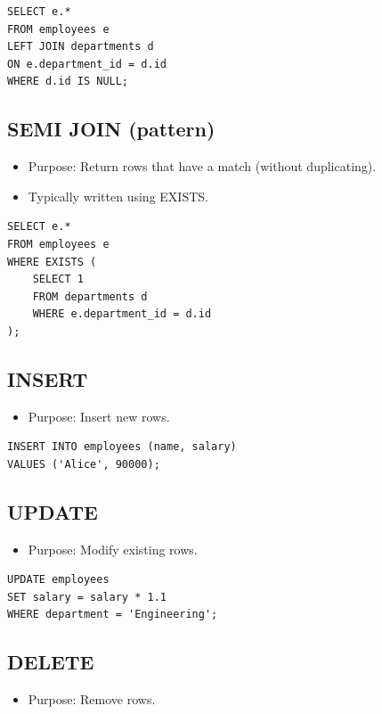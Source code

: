 \documentclass[10pt]{article}
\begin{document}
\begin{verbatim}
SELECT e.*
FROM employees e
LEFT JOIN departments d
ON e.department_id = d.id
WHERE d.id IS NULL;
\end{verbatim}

\subsection{SEMI JOIN (pattern)}
\begin{itemize}
    \item Purpose: Return rows that have a match (without duplicating).
    \item Typically written using EXISTS.
\end{itemize}

\begin{verbatim}
SELECT e.*
FROM employees e
WHERE EXISTS (
    SELECT 1
    FROM departments d
    WHERE e.department_id = d.id
);
\end{verbatim}

\subsection{INSERT}
\begin{itemize}
    \item Purpose: Insert new rows.
\end{itemize}

\begin{verbatim}
INSERT INTO employees (name, salary)
VALUES ('Alice', 90000);
\end{verbatim}

\subsection{UPDATE}
\begin{itemize}
    \item Purpose: Modify existing rows.
\end{itemize}

\begin{verbatim}
UPDATE employees
SET salary = salary * 1.1
WHERE department = 'Engineering';
\end{verbatim}

\subsection{DELETE}
\begin{itemize}
    \item Purpose: Remove rows.
\end{itemize}
\end{document}
